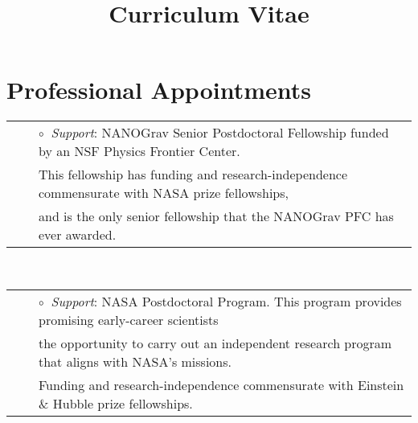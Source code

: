 \documentclass[11pt,letterpaper,sans]{moderncv}
\title{\huge{Curriculum Vitae}}
\begin{document}
\makecvtitle 

\vspace{-10mm}

\section{Professional Appointments}

 \vspace{-6mm}
\begin{tabular}{rcl}
&\hspace{0.4cm} &{\color{color1} $\circ\;\;$}{\textit{Support}}: NANOGrav Senior Postdoctoral Fellowship funded by an NSF Physics Frontier Center. \\
&\hspace{0.4cm} &  \hspace{0.4cm}This fellowship has funding and research-independence commensurate with NASA prize fellowships, \\
&\hspace{0.4cm} &  \hspace{0.4cm}and is the only senior fellowship that the NANOGrav PFC has ever awarded. \\
\end{tabular}\\ 
\vspace{1mm}

 \vspace{-6mm}
\begin{tabular}{rcl}
&\hspace{0.4cm} &{\color{color1} $\circ\;\;$}{\textit{Support}}: NASA Postdoctoral Program. This program provides promising early-career scientists \\
&\hspace{0.4cm} &  \hspace{0.4cm}the opportunity to carry out an independent research program that aligns with NASA's missions. \\
&\hspace{0.4cm} &  \hspace{0.4cm}Funding and research-independence commensurate with Einstein \& Hubble prize fellowships. \\
\end{tabular}\\ 
\vspace{1mm}
\end{document}
